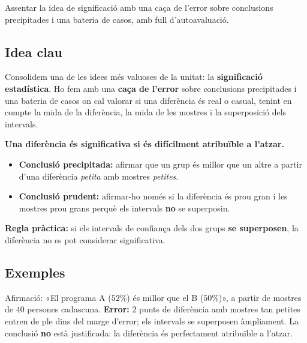 %
{Assentar la idea de significació amb una caça de l'error sobre conclusions precipitades i una bateria de casos, amb full d'autoavaluació.}

\subsection{Idea clau}

Consolidem una de les idees més valuoses de la unitat: la \textbf{significació
estadística}. Ho fem amb una \textbf{caça de l'error} sobre conclusions precipitades i una
bateria de casos on cal valorar si una diferència és real o casual, tenint en compte la
mida de la diferència, la mida de les mostres i la superposició dels intervals.

\begin{idea}
\textbf{Una diferència és significativa si és difícilment atribuïble a l'atzar.}
\begin{itemize}[leftmargin=1.4em, itemsep=2pt]
  \item \textbf{Conclusió precipitada:} afirmar que un grup és millor que un altre a partir
        d'una diferència \emph{petita} amb mostres \emph{petites}.
  \item \textbf{Conclusió prudent:} afirmar-ho només si la diferència és prou gran i les
        mostres prou grans perquè els intervals \textbf{no} se superposin.
\end{itemize}
\textbf{Regla pràctica:} si els intervals de confiança dels dos grups \textbf{se
superposen}, la diferència no es pot considerar significativa.
\end{idea}

\subsection{Exemples}

\begin{exemple}
Afirmació: «El programa A ($52\%$) és millor que el B ($50\%$)», a partir de mostres de $40$
persones cadascuna. \textbf{Error:} $2$ punts de diferència amb mostres tan petites entren
de ple dins del marge d'error; els intervals se superposen àmpliament. La conclusió
\textbf{no} està justificada: la diferència és perfectament atribuïble a l'atzar.
\end{exemple}

